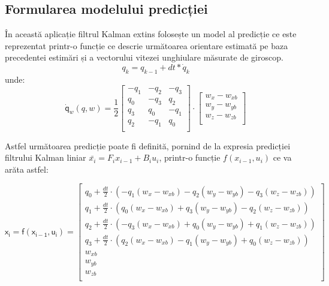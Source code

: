 \subsection{Formularea modelului predicției}
\-\hspace{1cm}În această aplicație filtrul Kalman extins folosește un model al predicție ce este reprezentat printr-o funcție ce descrie următoarea orientare estimată pe baza precedentei estimări și a vectorului vitezei unghiulare măsurate de giroscop. 
\begin{equation}
q_k=q_{k-1}+dt*\dot{q}_k
\end{equation}
 unde: 
 \begin{equation}
\mathsf{\dot{q}_\textit{w}(\textit{q},\textit{w})} =
\frac{1}{2}
\begin{bmatrix}
 -q_1 & -q_2 & -q_3\\
 q_0 & -q_3 & q_2\\
 q_3 & q_0 & -q_1\\
 q_2 & -q_1 & q_0\\
\end{bmatrix}
\cdot
\begin{bmatrix}
w_x-w_{xb}\\
w_y-w_{yb}\\
w_z-w_{zb}\\
\end{bmatrix}
\end{equation}

\-\hspace{1cm}Astfel următoarea predicție poate fi definită, pornind de la expresia predicției filtrului Kalman liniar $\bar{x_i}=F_ix_{i-1}+B_iu_i$, printr-o funcție $f(x_{i-1},u_i)$ ce va arăta astfel:


\begin{equation}
{\mathsf{\textit{$x_i=f(x_{i-1},u_i)$}} = 
\begin{bmatrix}
q_0+\frac{dt}{2}\cdot(-q_1(w_x-w_{xb})-q_2(w_y-w_{yb})-q_3(w_z-w_{zb}))\\
q_1+\frac{dt}{2}\cdot(q_0(w_x-w_{xb})+q_3(w_y-w_{yb})-q_2(w_z-w_{zb}))\\
q_2+\frac{dt}{2}\cdot(-q_3(w_x-w_{xb})+q_0(w_y-w_{yb})+q_1(w_z-w_{zb}))\\
q_3+\frac{dt}{2}\cdot(q_2(w_x-w_{xb})-q_1(w_y-w_{yb})+q_0(w_z-w_{zb}))\\
w_{xb}\\
w_{yb}\\
w_{zb}\\
\end{bmatrix}}
\end{equation}

